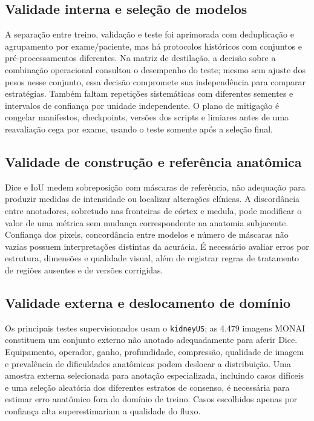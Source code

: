 \documentclass[12pt]{article}
\begin{document}
\subsection{Validade interna e seleção de modelos}
A separação entre treino, validação e teste foi aprimorada com deduplicação e agrupamento por exame/paciente, mas há protocolos históricos com conjuntos e pré-processamentos diferentes. Na matriz de destilação, a decisão sobre a combinação operacional consultou o desempenho do teste; mesmo sem ajuste dos pesos nesse conjunto, essa decisão compromete sua independência para comparar estratégias. Também faltam repetições sistemáticas com diferentes sementes e intervalos de confiança por unidade independente. O plano de mitigação é congelar manifestos, checkpoints, versões dos scripts e limiares antes de uma reavaliação cega por exame, usando o teste somente após a seleção final.

\subsection{Validade de construção e referência anatômica}
Dice e IoU medem sobreposição com máscaras de referência, não adequação para produzir medidas de intensidade ou localizar alterações clínicas. A discordância entre anotadores, sobretudo nas fronteiras de córtex e medula, pode modificar o valor de uma métrica sem mudança correspondente na anatomia subjacente. Confiança dos pixels, concordância entre modelos e número de máscaras não vazias possuem interpretações distintas da acurácia. É necessário avaliar erros por estrutura, dimensões e qualidade visual, além de registrar regras de tratamento de regiões ausentes e de versões corrigidas.

\subsection{Validade externa e deslocamento de domínio}
Os principais testes supervisionados usam o \texttt{kidneyUS}; as 4.479 imagens MONAI constituem um conjunto externo não anotado adequadamente para aferir Dice. Equipamento, operador, ganho, profundidade, compressão, qualidade de imagem e prevalência de dificuldades anatômicas podem deslocar a distribuição. Uma amostra externa selecionada para anotação especializada, incluindo casos difíceis e uma seleção aleatória dos diferentes estratos de consenso, é necessária para estimar erro anatômico fora do domínio de treino. Casos escolhidos apenas por confiança alta superestimariam a qualidade do fluxo.
\end{document}
